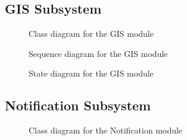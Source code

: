 \documentclass{article}
\begin{document}
		\subsection{GIS Subsystem}
		
			\begin{figure}[H]
				
				\caption{Class diagram for the GIS module}
				
			\end{figure}
		
			\begin{figure}[H]
				
				\caption{Sequence diagram for the GIS module}
				
			\end{figure}	
			
			\begin{figure}[H]
				
				\caption{State diagram for the GIS module}
				
			\end{figure}

		\pagebreak
		
		\subsection{Notification Subsystem}
			
			\begin{figure}[H]
				
				\caption{Class diagram for the Notification module}
				
			\end{figure}
		
\end{document}
